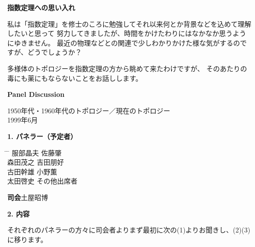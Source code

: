 \documentclass[uplatex,dvipdfmx]{jlreq}
\begin{document}
\newpage

\begin{center}
{\large\bfseries 指数定理への思い入れ}

\hspace*{\fill}{\large\bfseries 吉田 朋好（東工大・理）}
\end{center}

\medskip

私は「指数定理」を修士のころに勉強してそれ以来何とか背景などを込めて理解したいと思って
努力してきましたが、時間をかけたわりにはなかなか思うようにゆきません。
最近の物理などとの関連で少しわかりかけた様な気がするのですが、どうでしょうか？

多様体のトポロジーを指数定理の方から眺めて来たわけですが、
そのあたりの毒にも薬にもならないことをお話しします。

\newpage

\begin{center}
  {\large\bfseries Panel Discussion}
\end{center}
\begin{center}
  1950年代・1960年代のトポロジー／現在のトポロジー\\
  1999年6月
\end{center}

\medskip
\noindent\textbf{1. パネラー（予定者）}

\medskip
\begin{tabbing}
  \hspace{2cm} \= \hspace{4cm} \= \hspace{4cm} \kill
  \> 服部晶夫 \> 佐藤肇 \\
  \> 森田茂之 \> 吉田朋好 \\
  \> 古田幹雄 \> 小野薫 \\
  \> 太田啓史 \> その他出席者
\end{tabbing}

\medskip
\noindent\textbf{司会}\quad 土屋昭博

\bigskip
\noindent\textbf{2. 内容}

\medskip
それぞれのパネラーの方々に司会者よりまず最初に次の(1)よりお聞きし、(2)(3)に移ります。
\end{document}
